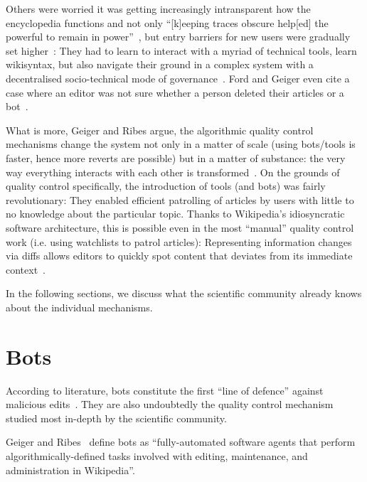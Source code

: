 Others were worried it was getting increasingly intransparent how the encyclopedia functions and not only ``[k]eeping traces obscure help[ed] the powerful to remain in power''~\cite{ForGei2012},
but entry barriers for new users were gradually set higher~\cite{HalGeiMorRied2013}:
They had to learn to interact with a myriad of technical tools, learn wikisyntax, but also navigate their ground in a complex system with a decentralised socio-technical mode of governance~\cite{Geiger2017}.
Ford and Geiger even cite a case where an editor was not sure whether a person deleted their articles or a bot~\cite{ForGei2012}.

What is more, Geiger and Ribes argue, the algorithmic quality control mechanisms change the system not only in a matter of scale (using bots/tools is faster, hence more reverts are possible) but in a matter of substance: the very way everything interacts with each other is transformed~\cite{GeiRib2010}.
On the grounds of quality control specifically, the introduction of tools (and bots) was fairly revolutionary:
They enabled efficient patrolling of articles by users with little to no knowledge about the particular topic.
Thanks to Wikipedia's idiosyncratic software architecture, this is possible even in the most ``manual'' quality control work (i.e. using watchlists to patrol articles):
Representing information changes via diffs allows editors to quickly spot content that deviates from its immediate context~\cite{GeiRib2010}.

In the following sections, we discuss what the scientific community already knows about the individual mechanisms.


\section{Bots}
\label{section:bots}

According to literature, bots constitute the first ``line of defence'' against malicious edits~\cite{GeiHal2013}. %
They are also undoubtedly the quality control mechanism studied most in-depth by the scientific community.

Geiger and Ribes~\cite{GeiRib2010} define bots as
``fully-automated software
agents that perform algorithmically-defined tasks involved
with editing, maintenance, and administration in Wikipedia''.

